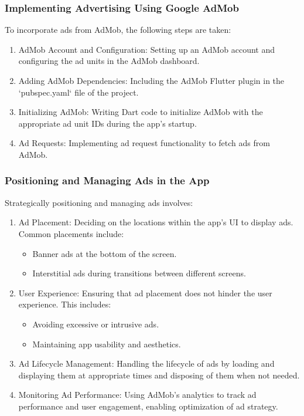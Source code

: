 \documentclass{book}
\begin{document}
\subsubsection{Implementing Advertising Using Google AdMob}
To incorporate ads from AdMob, the following steps are taken:
\begin{enumerate}
    \item AdMob Account and Configuration: Setting up an AdMob account and configuring the ad units in the AdMob dashboard.
    \item Adding AdMob Dependencies: Including the AdMob Flutter plugin in the `pubspec.yaml` file of the project.
    \item Initializing AdMob: Writing Dart code to initialize AdMob with the appropriate ad unit IDs during the app's startup.
    \item Ad Requests: Implementing ad request functionality to fetch ads from AdMob.
\end{enumerate}

\subsubsection{Positioning and Managing Ads in the App}
Strategically positioning and managing ads involves:
\begin{enumerate}
    \item Ad Placement: Deciding on the locations within the app's UI to display ads. Common placements include:
    \begin{itemize}
        \item Banner ads at the bottom of the screen.
        \item Interstitial ads during transitions between different screens.
    \end{itemize}
    \item User Experience: Ensuring that ad placement does not hinder the user experience. This includes:
    \begin{itemize}
        \item Avoiding excessive or intrusive ads.
        \item Maintaining app usability and aesthetics.
    \end{itemize}
    \item Ad Lifecycle Management: Handling the lifecycle of ads by loading and displaying them at appropriate times and disposing of them when not needed.
    \item Monitoring Ad Performance: Using AdMob's analytics to track ad performance and user engagement, enabling optimization of ad strategy.
\end{enumerate}
\end{document}
